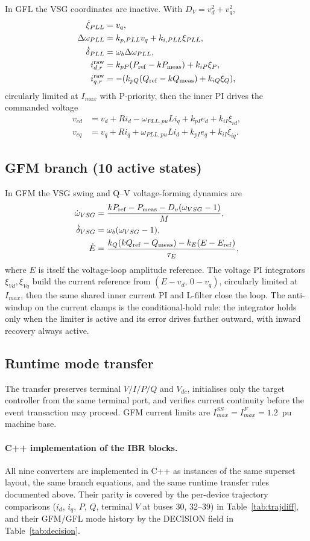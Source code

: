 In GFL the VSG coordinates are inactive.  With $D_V=v_d^2+v_q^2$,
\begin{align}
\dot\xi_{PLL}&=v_q,\\
\Delta\omega_{PLL}&=k_{p,PLL}v_q+k_{i,PLL}\xi_{PLL},\\
\dot\delta_{PLL}&=\omega_b\Delta\omega_{PLL},\\
i_{d,r}^{\rm raw}&=k_{pP}(P_{\rm ref}-k P_{\rm meas})+k_{iP}\xi_P,\\
i_{q,r}^{\rm raw}&=-(k_{pQ}(Q_{\rm ref}-k Q_{\rm meas})+k_{iQ}\xi_Q),
\end{align}
circularly limited at $I_{max}$ with P-priority, then the inner PI drives the
commanded voltage
\begin{align}
v_{cd}&=v_d+R i_d-\omega_{PLL,pu}L i_q+k_{pI}e_d+k_{iI}\xi_{id},\\
v_{cq}&=v_q+R i_q+\omega_{PLL,pu}L i_d+k_{pI}e_q+k_{iI}\xi_{iq}.
\end{align}

\subsection{GFM branch (10 active states)}

In GFM the VSG swing and Q--V voltage-forming dynamics are
\begin{align}
\dot\omega_{VSG}&=\frac{k P_{\rm ref}-P_{\rm meas}-D_v(\omega_{VSG}-1)}{M},\\
\dot\delta_{VSG}&=\omega_b(\omega_{VSG}-1),\\
\dot E&=\frac{k_Q(k Q_{\rm ref}-Q_{\rm meas})-k_E(E-E_{\rm ref})}{\tau_E},
\end{align}
where $E$ is itself the voltage-loop amplitude reference.  The voltage PI
integrators $\xi_{Vd},\xi_{Vq}$ build the current reference from
$(E-v_d,\,0-v_q)$, circularly limited at $I_{max}$, then the same shared
inner current PI and L-filter close the loop.  The anti-windup on the current
clamps is the conditional-hold rule: the integrator holds only when the
limiter is active and its error drives farther outward, with inward recovery
always active.

\subsection{Runtime mode transfer}

The transfer preserves terminal $V/I/P/Q$ and $V_{dc}$, initialises only the
target controller from the same terminal port, and verifies current
continuity before the event transaction may proceed.  GFM current limits are
$I_{max}^{SS}=I_{max}^{F}=1.2$~pu machine base.

\paragraph{C++ implementation of the IBR blocks.}
All nine converters are implemented in C++ as instances of the same
superset layout, the same branch equations, and the same runtime transfer
rules documented above.  Their parity is covered by the per-device
trajectory comparisons ($i_d$, $i_q$, $P$, $Q$, terminal $V$ at buses
30, 32--39) in Table~\ref{tab:trajdiff}, and their GFM/GFL mode history by
the DECISION field  in
Table~\ref{tab:decision}.

